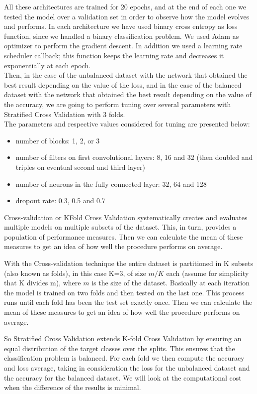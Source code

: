 \documentclass{article}
\begin{document}
All these architectures are trained for 20 epochs, and at the end of each one we tested the model over a validation set in order to observe how the model evolves and performs. In each architecture we have used binary cross entropy as loss function, since we handled a binary classification problem. We used Adam as optimizer to perform the gradient descent. In addition we used a learning rate scheduler callback; this function keeps the learning rate and decreases it exponentially at each epoch. \\

Then, in the case of the unbalanced dataset with the network that obtained the best result depending on the value of the loss,  and in the case of the balanced dataset with the network that obtained the best result depending on the value of the accuracy, we are going to perform tuning over several parameters with Stratified Cross Validation with 3 folds. \\

The parameters and respective values considered for tuning are presented below:
\begin{itemize}
    \item number of blocks: 1, 2, or 3
    \item number of filters on first convolutional layers: 8, 16 and 32 (then doubled and triples on eventual second and third layer)
    \item number of neurons in the fully connected layer: 32, 64 and 128
    \item dropout rate: 0.3, 0.5 and 0.7
\end{itemize}

Cross-validation or KFold Cross Validation systematically creates and evaluates multiple models on multiple subsets of the dataset. This, in turn, provides a population of performance measures. Then we can calculate the mean of these measures to get an idea of how well the procedure performs on average.

With the Cross-validation technique the entire dataset is partitioned in K subsets (also known as folds), in this case K=3, of size $m/K$ each (assume for simplicity that K divides m), where $m$ is the size of the dataset. Basically at each iteration the model is trained on two folds and then tested on the last one. This process runs until each fold has been the test set exactly once.
Then we can calculate the mean of these measures to get an idea of how well the procedure performs on average.

So Stratified Cross Validation extends K-fold Cross Validation by ensuring an equal distribution of the target classes over the splits. This ensures that the classification problem is balanced.
For each fold we then compute the accuracy and loss average, taking in consideration the loss for the unbalanced dataset and the accuracy for the balanced dataset. We will look at the computational cost when the difference of the results is minimal.
\end{document}
